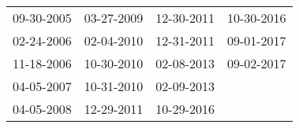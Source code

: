 \begin{supertabular}{llll}
 09-30-2005 &  03-27-2009 &  12-30-2011 &  10-30-2016 \\
 02-24-2006 &  02-04-2010 &  12-31-2011 &  09-01-2017 \\
 11-18-2006 &  10-30-2010 &  02-08-2013 &  09-02-2017 \\
 04-05-2007 &  10-31-2010 &  02-09-2013 &             \\
 04-05-2008 &  12-29-2011 &  10-29-2016 &             \\
\end{supertabular}
